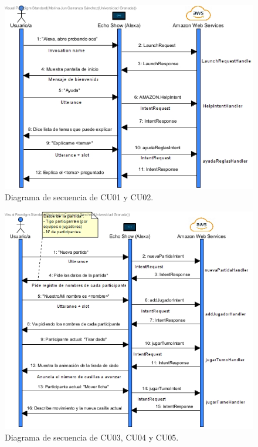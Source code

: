 \vline
\begin{figure}[H]
	\centering
	\includegraphics[width=1\textwidth]{imgs/DS01.jpg}
	\caption{Diagrama de secuencia de CU01 y CU02.}
	\label{fig:DS01}
\end{figure}

\begin{figure}[H]
	\centering
	\includegraphics[width=1\textwidth]{imgs/DS02.jpg}
	\caption{Diagrama de secuencia de CU03, CU04 y CU05.}
	\label{fig:DS02}
\end{figure}

